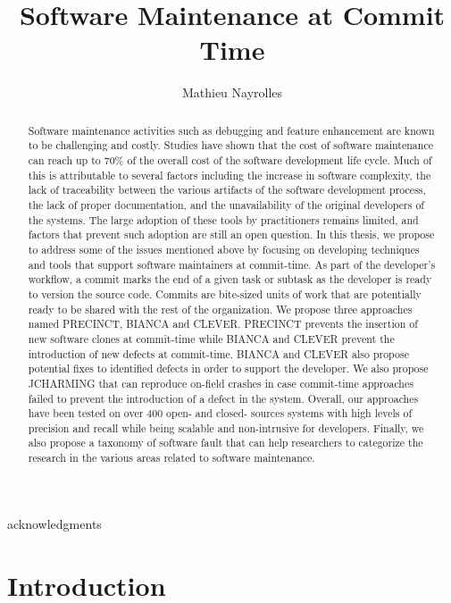 \documentclass[12pt]{report}
\author{Mathieu Nayrolles}
\title{Software Maintenance at Commit Time}
\begin{document}
\begin{abstract}
  Software maintenance activities such as debugging and feature
  enhancement are known to be challenging and costly. Studies have shown
  that the cost of software maintenance can reach up to 70\% of the
  overall cost of the software development life cycle. Much of this is
  attributable to several factors including the increase in software
  complexity, the lack of traceability between the various artifacts of
  the software development process, the lack of proper documentation, and
  the unavailability of the original developers of the systems. The large
  adoption of these tools by practitioners remains limited, and factors
  that prevent such adoption are still an open question. In this thesis,
  we propose to address some of the issues mentioned above by focusing on
  developing techniques and tools that support software maintainers at
  commit-time. As part of the developer's workflow, a commit marks the end
  of a given task or subtask as the developer is ready to version the
  source code. Commits are bite-sized units of work that are potentially
  ready to be shared with the rest of the organization. We propose three
  approaches named PRECINCT, BIANCA and CLEVER. PRECINCT prevents the
  insertion of new software clones at commit-time while BIANCA and CLEVER
  prevent the introduction of new defects at commit-time. BIANCA and
  CLEVER also propose potential fixes to identified defects in order to
  support the developer. We also propose JCHARMING that can reproduce
  on-field crashes in case commit-time approaches failed to prevent the
  introduction of a defect in the system. Overall, our approaches have
  been tested on over 400 open- and closed- sources systems with high
  levels of precision and recall while being scalable and non-intrusive
  for developers. Finally, we also propose a taxonomy of software fault
  that can help researchers to categorize the research in the various
  areas related to software maintenance.
\end{abstract}

\begin{acknowledgments}
  acknowledgments
\end{acknowledgments}


\chapter{Introduction}
\end{document}
